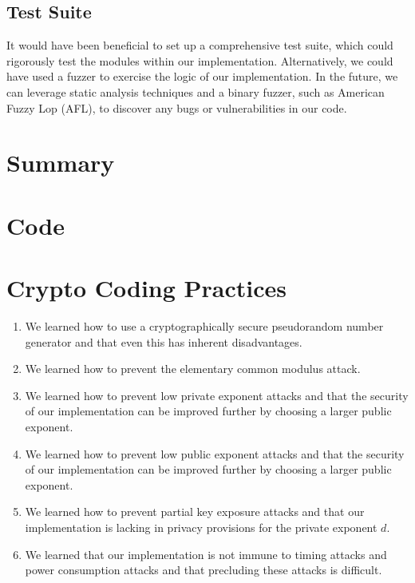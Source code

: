 \documentclass[a4paper]{article}
\begin{document}
\subsection{Test Suite}

It would have been beneficial to set up a comprehensive test suite, which could rigorously test the modules within our implementation. Alternatively, we could have used a fuzzer to exercise the logic of our implementation. In the future, we can leverage static analysis techniques and a binary fuzzer, such as American Fuzzy Lop (AFL), to discover any bugs or vulnerabilities in our code.

\section{Summary}




\appendix

\section{Code}





\section{Crypto Coding Practices}

\begin{enumerate}
    \item We learned how to use a cryptographically secure pseudorandom number generator and that even this has inherent disadvantages.

    \item We learned how to prevent the elementary common modulus attack.

    \item We learned how to prevent low private exponent attacks and that the security of our implementation can be improved further by choosing a larger public exponent.

    \item We learned how to prevent low public exponent attacks and that the security of our implementation can be improved further by choosing a larger public exponent.

    \item We learned how to prevent partial key exposure attacks and that our implementation is lacking in privacy provisions for the private exponent $d$.

    \item We learned that our implementation is not immune to timing attacks and power consumption attacks and that precluding these attacks is difficult.
\end{enumerate}
\end{document}

